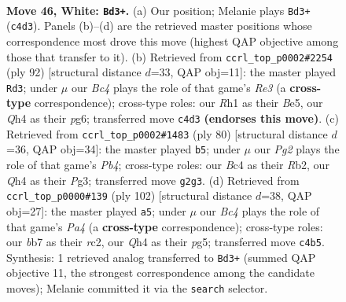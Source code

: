\documentclass[11pt]{article}
\begin{document}
\clearpage

\begin{figure}[p]\centering
\begin{subfigure}{0.46\textwidth}\centering
\resizebox{\linewidth}{!}{%
\newchessgame
\chessboard[
  setfen={5r2/1b6/6k1/8/2B4Q/7P/1p4P1/6KR w - - 1 46},
  showmover=false,
  pgfstyle=straightmove, color=movearrow, markmove={c4-d3}
]}
\caption{}
\end{subfigure}\hfill
\begin{subfigure}{0.46\textwidth}\centering
\resizebox{\linewidth}{!}{%
\newchessgame
\chessboard[
  setfen={8/3k4/6p1/3bB1P1/6P1/4RP2/7K/2r5 w - - 7 47},
  showmover=false,
  pgfstyle=straightmove, color=movearrow, markmove={e3-d3}
]}
\caption{}
\end{subfigure}
\\[4pt]
\begin{subfigure}{0.46\textwidth}\centering
\resizebox{\linewidth}{!}{%
\newchessgame
\chessboard[
  setfen={1r6/6pp/8/4k3/1P2p3/2K3P1/1R5P/8 w - - 8 41},
  showmover=false,
  pgfstyle=straightmove, color=movearrow, markmove={b4-b5}
]}
\caption{}
\end{subfigure}\hfill
\begin{subfigure}{0.46\textwidth}\centering
\resizebox{\linewidth}{!}{%
\newchessgame
\chessboard[
  setfen={8/6k1/R7/6pp/P7/6P1/2r2PK1/8 w - - 2 52},
  showmover=false,
  pgfstyle=straightmove, color=movearrow, markmove={a4-a5}
]}
\caption{}
\end{subfigure}
\caption{\textbf{Move 46, White: \texttt{Bd3+}.} (a) Our position; Melanie plays \texttt{Bd3+} (\texttt{c4d3}). Panels (b)--(d) are the retrieved master positions whose correspondence most drove this move (highest QAP objective among those that transfer to it). (b) Retrieved from \texttt{ccrl\_top\_p0002\#2254} (ply 92) [structural distance $d$=33, QAP obj=11]: the master played \texttt{Rd3}; under $\mu$ our \emph{Bc4} plays the role of that game's \emph{Re3} (a \textbf{cross-type} correspondence); cross-type roles: our \emph{R}h1 as their \emph{B}e5, our \emph{Q}h4 as their \emph{p}g6; transferred move \texttt{c4d3} \textbf{(endorses this move)}. (c) Retrieved from \texttt{ccrl\_top\_p0002\#1483} (ply 80) [structural distance $d$=36, QAP obj=34]: the master played \texttt{b5}; under $\mu$ our \emph{Pg2} plays the role of that game's \emph{Pb4}; cross-type roles: our \emph{B}c4 as their \emph{R}b2, our \emph{Q}h4 as their \emph{P}g3; transferred move \texttt{g2g3}. (d) Retrieved from \texttt{ccrl\_top\_p0000\#139} (ply 102) [structural distance $d$=38, QAP obj=27]: the master played \texttt{a5}; under $\mu$ our \emph{Bc4} plays the role of that game's \emph{Pa4} (a \textbf{cross-type} correspondence); cross-type roles: our \emph{b}b7 as their \emph{r}c2, our \emph{Q}h4 as their \emph{p}g5; transferred move \texttt{c4b5}. Synthesis: 1 retrieved analog transferred to \texttt{Bd3+} (summed QAP objective 11, the strongest correspondence among the candidate moves); Melanie committed it via the \texttt{search} selector.}
\label{fig:thought-m90}
\end{figure}
\end{document}
